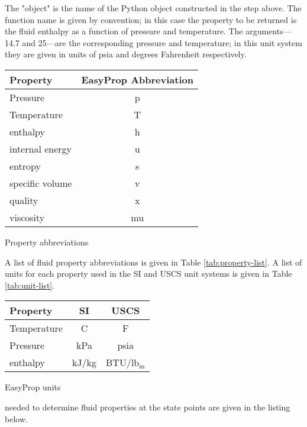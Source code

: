 The "object" is the name of the Python object constructed in the step above.  The function name is given by convention; in this case the property to be returned is the fluid enthalpy as a function of pressure and temperature.  The arguments---14.7 and 25---are the corresponding pressure and temperature; in this unit system they are given in units of psia and degrees Fahrenheit respectively.
\begin{margintable}
\begin{tabular}{lc}
\toprule
Property & EasyProp Abbreviation \\
\midrule
Pressure & p \\
Temperature & T \\
enthalpy & h \\
internal energy  & u \\
entropy & s \\
specific volume  & v \\
quality & x \\
viscosity & mu \\
\bottomrule
\end{tabular}
\caption{Property abbreviations}
\label{tab:property-list}
\vspace{0.5cm}
\end{margintable}

A list of fluid property abbreviations is given in Table \ref{tab:property-list}.  A list of units for each property used in the SI and USCS unit systems is given in Table \ref{tab:unit-list}.


\begin{margintable}
\begin{tabular}{lcc}
\toprule
Property & SI & USCS \\
\midrule
Temperature & C & F \\
Pressure & kPa & psia \\
enthalpy & kJ/kg & BTU/lb$_{\text{m}}$ \\
\bottomrule
\end{tabular}
\caption{EasyProp units}
\label{tab:unit-list}
\end{margintable}

 needed to determine fluid properties at the state points are given in the listing below.

